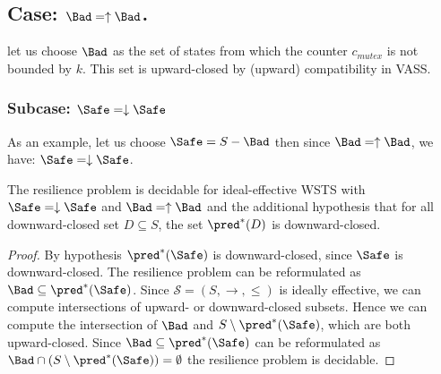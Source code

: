 

\subsection{Case: $\Bad=\uparrow \Bad$.}
%
%

let us choose $\Bad$ as the set of states from which the counter $c_{mutex}$ is not bounded by $k$.
This set is upward-closed by (upward) compatibility in VASS.

\subsubsection{Subcase: $\Safe=\downarrow \Safe$}

As an example, let us choose $\Safe=S-\Bad$ then since $\Bad=\uparrow \Bad$, we have: $\Safe=\downarrow \Safe$.
%
%
\begin{theorem}\label{up-down}
The resilience problem is decidable for ideal-effective WSTS with 
$\Safe=\downarrow \Safe$
and $\Bad=\uparrow \Bad$
and
the additional hypothesis that
for all downward-closed set $D \subseteq S$, the set $\pred^*(D)$ is downward-closed.
\end{theorem}

\begin{proof}
By hypothesis $\pred^*(\Safe)$ is downward-closed, since $\Safe$ is downward-closed.
The resilience problem can be reformulated as 
$\Bad \subseteq  \pred^*(\Safe)$.
Since $\mathscr{S}=(S,\rightarrow, \leq)$ is ideally effective, we can compute intersections of upward- or downward-closed  subsets.
Hence we can compute the intersection of
$\Bad$
and
$S \setminus \pred^*(\Safe)$,
which are both upward-closed.
Since
$\Bad \subseteq \pred^*(\Safe)$
can be reformulated as
$\Bad \cap (S \setminus \pred^*(\Safe)) = \emptyset$
the resilience problem is decidable.
\end{proof}


